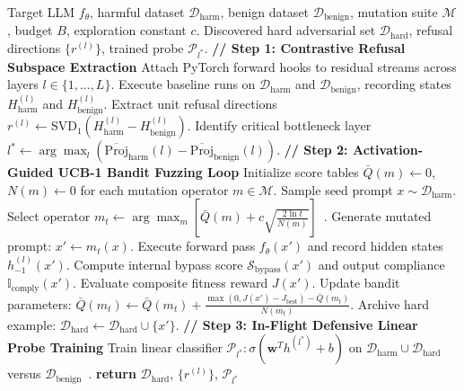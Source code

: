 \documentclass[manuscript,screen,review,anonymous]{acmart}
\begin{document}
\begin{algorithm}[t]
\caption{The REFLEX Testing and Defense Pipeline}
\label{alg:reflex}
\begin{algorithmic}[1]
\REQUIRE Target LLM $f_\theta$, harmful dataset $\mathcal{D}_{\text{harm}}$, benign dataset $\mathcal{D}_{\text{benign}}$, mutation suite $\mathcal{M}$, budget $B$, exploration constant $c$.
\ENSURE Discovered hard adversarial set $\mathcal{D}_{\text{hard}}$, refusal directions $\{r^{(l)}\}$, trained probe $\mathcal{P}_{l^*}$.
\STATE \textbf{// Step 1: Contrastive Refusal Subspace Extraction}
\STATE Attach PyTorch forward hooks to residual streams across layers $l \in \{1, \dots, L\}$.
\STATE Execute baseline runs on $\mathcal{D}_{\text{harm}}$ and $\mathcal{D}_{\text{benign}}$, recording states $H_{\text{harm}}^{(l)}$ and $H_{\text{benign}}^{(l)}$.
\STATE Extract unit refusal directions $r^{(l)} \leftarrow \text{SVD}_1(H_{\text{harm}}^{(l)} - H_{\text{benign}}^{(l)})$.
\STATE Identify critical bottleneck layer $l^* \leftarrow \arg\max_l \left( \overline{\text{Proj}}_{\text{harm}}(l) - \overline{\text{Proj}}_{\text{benign}}(l) \right)$.
\STATE \textbf{// Step 2: Activation-Guided UCB-1 Bandit Fuzzing Loop}
\STATE Initialize score tables $\bar{Q}(m) \leftarrow 0$, $N(m) \leftarrow 0$ for each mutation operator $m \in \mathcal{M}$.
    \STATE Sample seed prompt $x \sim \mathcal{D}_{\text{harm}}$.
    \STATE Select operator $m_t \leftarrow \arg\max_m \left[ \bar{Q}(m) + c \sqrt{\frac{2 \ln t}{N(m)}} \right]$~\cite{auer2002finite,lattimore2020bandit}.
    \STATE Generate mutated prompt: $x' \leftarrow m_t(x)$.
    \STATE Execute forward pass $f_\theta(x')$ and record hidden states $h_{-1}^{(l)}(x')$.
    \STATE Compute internal bypass score $\mathcal{S}_{\text{bypass}}(x')$ and output compliance $\mathbb{I}_{\text{comply}}(x')$.
    \STATE Evaluate composite fitness reward $J(x')$.
    \STATE Update bandit parameters: $\bar{Q}(m_t) \leftarrow \bar{Q}(m_t) + \frac{\max(0, J(x') - J_{\text{best}}) - \bar{Q}(m_t)}{N(m_t)}$.
        \STATE Archive hard example: $\mathcal{D}_{\text{hard}} \leftarrow \mathcal{D}_{\text{hard}} \cup \{x'\}$.
    \ENDIF
\ENDFOR
\STATE \textbf{// Step 3: In-Flight Defensive Linear Probe Training}
\STATE Train linear classifier $\mathcal{P}_{l^*}: \sigma(\mathbf{w}^T h^{(l^*)} + b)$ on $\mathcal{D}_{\text{harm}} \cup \mathcal{D}_{\text{hard}}$ versus $\mathcal{D}_{\text{benign}}$~\cite{alain2016understanding,belinkov2022probing}.
\STATE \textbf{return} $\mathcal{D}_{\text{hard}}$, $\{r^{(l)}\}$, $\mathcal{P}_{l^*}$
\end{algorithmic}
\end{algorithm}
\end{document}
